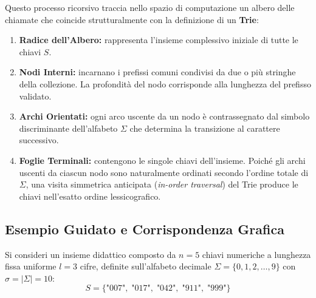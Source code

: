Questo processo ricorsivo traccia nello spazio di computazione un albero delle chiamate che coincide strutturalmente con la definizione di un \textbf{Trie}:
\begin{enumerate}
  \item \textbf{Radice dell'Albero:} rappresenta l'insieme complessivo iniziale di tutte le chiavi $S$.
  \item \textbf{Nodi Interni:} incarnano i prefissi comuni condivisi da due o pi\`u stringhe della collezione. La profondit\`a del nodo corrisponde alla lunghezza del prefisso validato.
  \item \textbf{Archi Orientati:} ogni arco uscente da un nodo \`e contrassegnato dal simbolo discriminante dell'alfabeto $\Sigma$ che determina la transizione al carattere successivo.
  \item \textbf{Foglie Terminali:} contengono le singole chiavi dell'insieme. Poich\'e gli archi uscenti da ciascun nodo sono naturalmente ordinati secondo l'ordine totale di $\Sigma$, una visita simmetrica anticipata (\textit{in-order traversal}) del Trie produce le chiavi nell'esatto ordine lessicografico.
\end{enumerate}

\FloatBarrier
\subsection{Esempio Guidato e Corrispondenza Grafica}
\label{subsec:esempio-guidato-msd-trie}

Si consideri un insieme didattico composto da $n = 5$ chiavi numeriche a lunghezza fissa uniforme $l = 3$ cifre, definite sull'alfabeto decimale $\Sigma = \{0, 1, 2, \dots, 9\}$ con $\sigma = |\Sigma| = 10$:
\begin{equation}
  S = \{ \text{"007"}, \; \text{"017"}, \; \text{"042"}, \; \text{"911"}, \; \text{"999"} \}
\end{equation}

